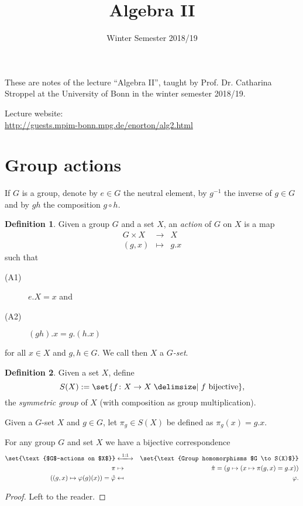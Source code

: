 \documentclass[12pt,a4paper]{scrartcl}
\title{Algebra II}
\subtitle{Winter Semester 2018/19}
\date{\lastcompiled}
\theoremstyle{cplain}
\theoremstyle{cplain}
\theoremstyle{cplain}
\theoremstyle{definition}
\newtheorem*{deff}{Definition}
\begin{document}
\begin{otherlanguage}{english}

\maketitle
\tableofcontents
\newpage

\noindent
These are notes of the lecture \enquote{Algebra II}, taught by Prof. Dr. Catharina Stroppel at the University of Bonn in the winter semester 2018/19.

\bigskip

\noindent
Lecture website:\\
\url{http://guests.mpim-bonn.mpg.de/enorton/alg2.html}

\nocite{hungerford}
\nocite{knapp-basic}
\nocite{knapp-advanced}
\nocite{procesi}
\nocite{borel}
\nocite{humphreys}
\nocite{springer}
\printbibliography

\newpage


\section{Group actions}
If $G$ is a group, denote by $e \in G$ the neutral element, by $g^{-1}$ the inverse of $g\in G$ and by $gh$ the composition $g \circ h$.
\begin{deff}
  Given a group $G$ and a set $X$, an \emph{action} of $G$ on $X$ is a map
  \begin{eqnarray*}
    G \times X &\to& X \\
    (g,x) &\mapsto& g.x
  \end{eqnarray*}
  such that
  \begin{description}
   \item[(A1)] $e.X = x$ and
   \item[(A2)] $(gh).x = g.(h.x)$
  \end{description}
  for all $x \in X$ and $g,h \in G$. We call then $X$ a \emph{$G$-set}.
\end{deff}
\begin{deff}
  Given a set $X$, define \[ S(X) := \set{f\colon X \to X \given f \text{ bijective}}, \] the \emph{symmetric group} of $X$ (with composition as group multiplication).
  
  Given a $G$-set $X$ and $g\in G$, let $\pi_g \in S(X)$ be defined as $\pi_g(x) = g.x$.
\end{deff}
\begin{lem}
  For any group $G$ and set $X$ we have a bijective correspondence
  \begin{eqnarray*}
    \set{\text{$G$-actions on $X$}} &\xlongleftrightarrow{1:1}& \set{\text{Group homomorphisms $G \to S(X)$}} \\
    \pi &\mapsto& \hat\pi = (g \mapsto (x \mapsto \pi(g,x) = g.x)) \\
    ((g,x)\mapsto \phi(g)(x))=\mathring \phi &\mapsfrom& \phi.
  \end{eqnarray*}
\end{lem}
\begin{proof}
  Left to the reader.
\end{proof}


\end{otherlanguage}
\end{document}
